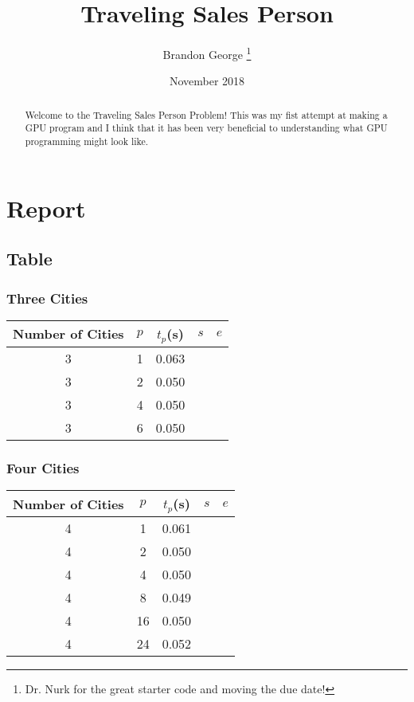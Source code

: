 \documentclass[12pt, letterpaper]{article}
\title{Traveling Sales Person}
\author{Brandon George \thanks{Dr. Nurk for the great starter code and moving the due date!}}
\date{November 2018}
\begin{document}
\begin{titlepage}
\maketitle
\end{titlepage}

\begin{abstract}
Welcome to the Traveling Sales Person Problem! This was my fist attempt at making a GPU program and I think that it has been very beneficial to understanding what GPU programming might look like.
\end{abstract}

\section{Report}

\subsection{Table}
\subsubsection{Three Cities}
\begin{center}
  \begin{tabular}{|c | c c c c ||}
    \hline
    Number of Cities & $p$ & $t_p$(s) & $s$ & $e$ \\
    \hline\hline
      3 & 1 & 0.063 &  &  \\
      3 & 2 & 0.050 &  &  \\
      3 & 4 & 0.050 &  &  \\
      3 & 6 & 0.050 &  &  \\
      \hline\hline
      \hline
  \end{tabular}
\end{center}
\subsubsection{Four Cities}
\begin{center}
  \begin{tabular}{|c | c c c c ||}
    \hline
    Number of Cities & $p$ & $t_p$(s) & $s$ & $e$ \\
    \hline\hline
      4 & 1 & 0.061 &  &  \\
      4 & 2 & 0.050 &  &  \\
      4 & 4 & 0.050 &  &  \\
      4 & 8 & 0.049 &  &  \\
      4 & 16 & 0.050 &  &  \\
      4 & 24 & 0.052 &  &  \\
      \hline\hline
      \hline
  \end{tabular}
\end{center}
\end{document}
